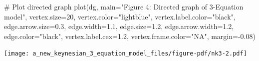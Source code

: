 \documentclass[
  letterpaper,
  DIV=11,
  numbers=noendperiod]{scrreprt}
\newenvironment{Shaded}{\begin{snugshade}}{\end{snugshade}}
\newcommand{\AttributeTok}[1]{\textcolor[rgb]{0.40,0.45,0.13}{#1}}
\newcommand{\CommentTok}[1]{\textcolor[rgb]{0.37,0.37,0.37}{#1}}
\newcommand{\DecValTok}[1]{\textcolor[rgb]{0.68,0.00,0.00}{#1}}
\newcommand{\FloatTok}[1]{\textcolor[rgb]{0.68,0.00,0.00}{#1}}
\newcommand{\FunctionTok}[1]{\textcolor[rgb]{0.28,0.35,0.67}{#1}}
\newcommand{\NormalTok}[1]{\textcolor[rgb]{0.00,0.23,0.31}{#1}}
\newcommand{\SpecialCharTok}[1]{\textcolor[rgb]{0.37,0.37,0.37}{#1}}
\newcommand{\StringTok}[1]{\textcolor[rgb]{0.13,0.47,0.30}{#1}}
\begin{document}
\begin{Shaded}
\begin{Highlighting}[]
\CommentTok{\# Plot directed graph}
\FunctionTok{plot}\NormalTok{(dg, }\AttributeTok{main=}\StringTok{"Figure 4: Directed graph of 3{-}Equation model"}\NormalTok{, }\AttributeTok{vertex.size=}\DecValTok{20}\NormalTok{, }\AttributeTok{vertex.color=}\StringTok{"lightblue"}\NormalTok{, }
     \AttributeTok{vertex.label.color=}\StringTok{"black"}\NormalTok{, }\AttributeTok{edge.arrow.size=}\FloatTok{0.3}\NormalTok{, }\AttributeTok{edge.width=}\FloatTok{1.1}\NormalTok{, }\AttributeTok{edge.size=}\FloatTok{1.2}\NormalTok{,}
     \AttributeTok{edge.arrow.width=}\FloatTok{1.2}\NormalTok{, }\AttributeTok{edge.color=}\StringTok{"black"}\NormalTok{, }\AttributeTok{vertex.label.cex=}\FloatTok{1.2}\NormalTok{, }
     \AttributeTok{vertex.frame.color=}\StringTok{"NA"}\NormalTok{, }\AttributeTok{margin=}\SpecialCharTok{{-}}\FloatTok{0.08}\NormalTok{)}
\end{Highlighting}
\end{Shaded}

\texttt{[image: a\_new\_keynesian\_3\_equation\_model\_files/figure-pdf/nk3-2.pdf]}
\end{document}
